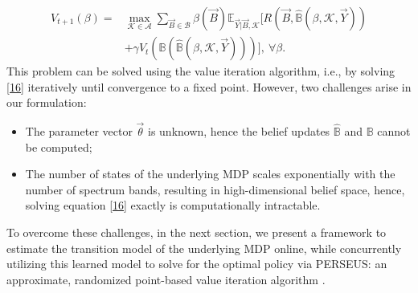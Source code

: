 \documentclass[10pt,twocolumn]{IEEEtran}
\begin{document}
\begin{align}\label{16}
\nonumber
        V_{t+1}(\beta) = &\max_{\mathcal{K} {\in} \mathcal{A}} \sum_{\vec{B} {\in} \mathcal{B}} \beta(\vec{B}) \mathbb{E}_{\vec{Y}|\vec{B}, \mathcal{K}} \Big[R(\vec{B}, \hat{\mathbb{B}}(\beta, \mathcal{K}, \vec{Y}))\\ &+\gamma V_{t}(\mathbb{B}(\hat{\mathbb{B}}(\beta, \mathcal{K}, \vec{Y})))\Big],\ \forall \beta.
\end{align}
This problem can be solved using the value iteration algorithm, i.e., by solving \eqref{16} iteratively until convergence to a fixed point. However, two challenges arise in our formulation:
\begin{itemize}[leftmargin=*]
\item The parameter vector $\vec{\theta}$ is unknown, hence the belief updates 
$\hat{\mathbb B}$ and $\mathbb B$ cannot be computed;
\item The number of states of the underlying MDP scales exponentially with the number of spectrum bands, resulting in high-dimensional belief space, hence, solving equation \eqref{16} exactly is computationally intractable.
\end{itemize}
To overcome these challenges, in the next section, we present a framework to estimate the transition model of the underlying MDP online, while concurrently utilizing this learned model to solve for the optimal policy via PERSEUS: an approximate, randomized point-based value iteration algorithm \cite{DBLP:journals/corr/abs-1109-2145}.
    \vspace{-3mm}
\end{document}
